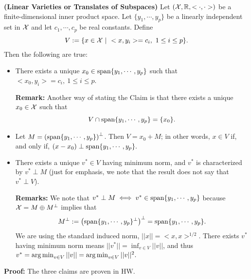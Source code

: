 \begin{lem} \textbf{(Linear Varieties or Translates of Subspaces)} Let $({\cal X}, \mathbb R, <\cdot, \cdot>)$ be a finite-dimensional inner product space.  Let $\{y_1, \cdots, y_p \}$ be a linearly independent set in ${\cal X}$ and let $c_1, \cdots, c_p$ be real constants.  Define $$V:=\{ x\in {\cal X}~|~ <x,y_i>=c_i,~1 \le i \le p\}. $$
Then the following are true:
  \begin{itemize}

\setlength{\itemsep}{.1in}

\item[ ]  \begin{claim}
There exists a unique $x_0 \in \mathrm{span} \{ y_1, \cdots, y_p \}$ such that $<x_0,y_i>=c_i,~1 \le i \le p$.
\end{claim} 

\textbf{Remark:} Another way of stating the Claim is that there exists a unique $x_0\in {\cal X}$ such that
$$V \cap \mathrm{span} \{ y_1, \cdots, y_p \} = \{x_0 \}.$$


\item[ ] \begin{claim}
Let $M= \left(\mathrm{span} \{ y_1, \cdots, y_p \} \right)^\perp$. Then $V=x_0 + M$; in other words, $x\in V$ if, and only if, $(x-x_0) \perp \mathrm{span} \{ y_1, \cdots, y_p \}.$
\end{claim}

\item[] \begin{claim}
\label{claim:VequalsMplusX0}
 There exists a unique $v^* \in V$ having minimum norm, and $v^*$ is characterized by $v^* \perp M$ (just for emphasis, we note that the result does not say that $v^* \perp V$).
\end{claim}

  \textbf{Remarks:} We note that $v^* \perp M \iff v^* \in \mathrm{span} \{ y_1, \cdots, y_p \}$ because ${\cal X} = M \oplus M^\perp$ implies that
  $$ M^\perp := \left( \mathrm{span} \{ y_1, \cdots, y_p \}^\perp \right)^\perp = \mathrm{span} \{ y_1, \cdots, y_p \}.$$
We are using the standard induced norm, $||x|| = <x,x>^{1/2}$. There exists $v^*$ having minimum norm means $||v^*|| = \inf_{v\in V} ||v||$,  and thus $v^* = \operatorname*{arg\,min}_{v\in V} ||v||=\operatorname*{arg\,min}_{v\in V} ||v||^2.$
  \end{itemize}


\end{lem}

\textbf{Proof:} The three claims are proven in HW. 
\Qed


